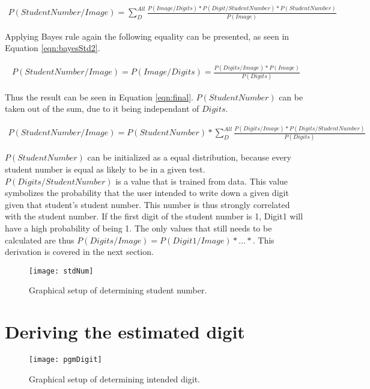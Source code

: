 \begin{align}
  P(StudentNumber/Image) = \sum_{D}^{All} \frac{P(Image/Digits)*P(Digit/StudentNumber)
  *P(StudentNumber)}{P(Image)}
\label{eqn:sumRule}
\end{align}

Applying Bayes rule again the following equality can be presented, as seen in Equation \ref{eqn:bayesStd2}.

\begin{align}
  P(StudentNumber/Image) = P(Image/Digits) = \frac{P(Digits/Image)*P(Image)}{P(Digits)}
\label{eqn:bayesStd2}
\end{align}

Thus the result can be seen in Equation \ref{eqn:final}. $P(StudentNumber)$ can be taken out of the sum, due to it being independant of $Digits$.

\begin{align}
  P(StudentNumber/Image) = P(StudentNumber)*\sum_{D}^{All} \frac{P(Digits/Image)
  *P(Digits/StudentNumber)}{P(Digits)}
\label{eqn:final}
\end{align}

$P(StudentNumber)$ can be initialized as a equal distribution, because every student number is equal as likely to be in a given test. $P(Digits/StudentNumber)$ is a value that is trained from data. This value symbolizes the probability that the user intended to write down a given digit given that student's student number. This number is thus strongly correlated with the student number. If the first digit of the student number is 1, Digit1 will have a high probability of being 1. The only values that still needs to be calculated are thus $P(Digits/Image) = P(Digit1/Image)*...*$. This derivation is covered in the next section.

\begin{figure}
  \centering
  \texttt{[image: stdNum]}\\
  \caption{Graphical setup of determining student number.}
  \label{fig:stdNum}
\end{figure}

\section{Deriving the estimated digit}
\label{sec:digit}



\begin{figure}
  \centering
  \texttt{[image: pgmDigit]}\\
  \caption{Graphical setup of determining intended digit.}
  \label{fig:pgmDigit}
\end{figure}
